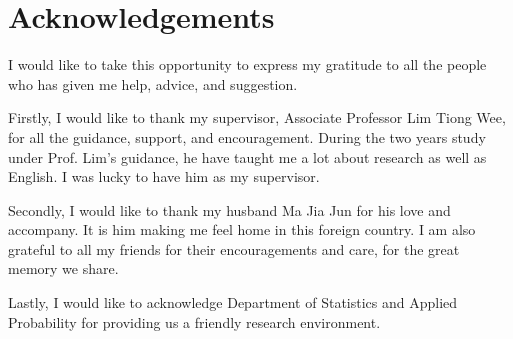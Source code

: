 \chapter{Acknowledgements}

I would like to take this opportunity to express my gratitude to all the people who has given me help, advice, and suggestion. 

Firstly, I would like to thank my supervisor, Associate Professor Lim Tiong Wee, for all the guidance, support, and encouragement. During the two years study under Prof. Lim's guidance, he have taught me a lot about research as well as English. I was lucky to have him as my supervisor. 

Secondly, I would like to thank my husband Ma Jia Jun for his love and accompany. It is him making me feel home in this foreign country. I am also grateful to all my friends for their encouragements and care, for the great memory we share. 

Lastly, I would like to acknowledge Department of Statistics and Applied Probability for providing us a friendly research environment. 


